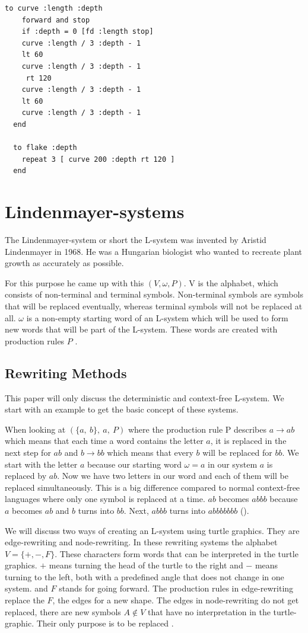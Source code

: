 \documentclass[a4paper, 11pt]{article}
\begin{document}
\begin{lstlisting}[title={Koch flake}]
  to curve :length :depth
    forward and stop
    if :depth = 0 [fd :length stop]
    curve :length / 3 :depth - 1
    lt 60
    curve :length / 3 :depth - 1
     rt 120
    curve :length / 3 :depth - 1
    lt 60
    curve :length / 3 :depth - 1
  end

  to flake :depth
    repeat 3 [ curve 200 :depth rt 120 ]
  end
\end{lstlisting}

\section{Lindenmayer-systems}
\label{sec:Lsystem}
The Lindenmayer-system or short the L-system was invented by Aristid Lindenmayer in 1968.
He was a Hungarian biologist who wanted to recreate plant growth as accurately as possible.

For this purpose he came up with this $(V, \omega, P)$.
V is the alphabet, which consists of non-terminal and terminal symbols. Non-terminal symbols are symbols that will be replaced eventually, whereas terminal symbols will not be replaced at all.
$\omega$ is a non-empty starting word of an L-system which will be used to form new words that will be part of the L-system. These words are created with production rules $P$ \cite{lsystem}.

\subsection{Rewriting Methods}
This paper will only discuss the deterministic and context-free L-system. We start with an example to get the basic concept of these systems.

When looking at $(\{a,\ b\},\ a,\ P)$ where the production rule P describes $a \rightarrow ab$ which means that each time a word contains the letter $a$, it is replaced in the next step for $ab$ and $b \rightarrow bb$ which means that every $b$ will be replaced for $bb$. We start with the letter $a$ because our starting word $\omega =a$ in our system $a$ is replaced by $ab$. Now we have two letters in our word and each of them will be replaced simultaneously. This is a big difference compared to normal context-free languages where only one symbol is replaced at a time. $ab$ becomes $abbb$ because $a$ becomes $ab$ and $b$ turns into $bb$. Next, $abbb$ turns into $abbbbbbb$ ().

We will discuss two ways of creating an L-system using turtle graphics. They are edge-rewriting and node-rewriting. In these rewriting systems the alphabet $V=\{+,-,F\}$. These characters form words that can be interpreted in the turtle graphics. $+$ means turning the head of the turtle to the right and $-$ means turning to the left, both with a predefined angle that does not change in one system. and $F$ stands for going forward.
The production rules in edge-rewriting replace the $F$, the edges for a new shape. The edges in node-rewriting do not get replaced, there are new symbols $A\notin V$ that have no interpretation in the turtle-graphic. Their only purpose is to be replaced \cite{lsystem}.
\end{document}
